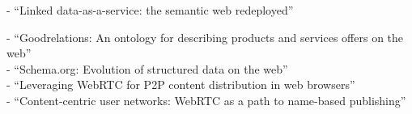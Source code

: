 - ``Linked data-as-a-service: the semantic web redeployed'' \citep{rietveld2015linked}

- ``Goodrelations: An ontology for describing products and services offers on the web'' \citep{hepp2008goodrelations} \\
- ``Schema.org: Evolution of structured data on the web'' \citep{guha2016schema} \\
- ``Leveraging WebRTC for P2P content distribution in web browsers'' \citep{vogt2013leveraging} \\
- ``Content-centric user networks: WebRTC as a path to name-based publishing'' \citep{vogt2013content}

